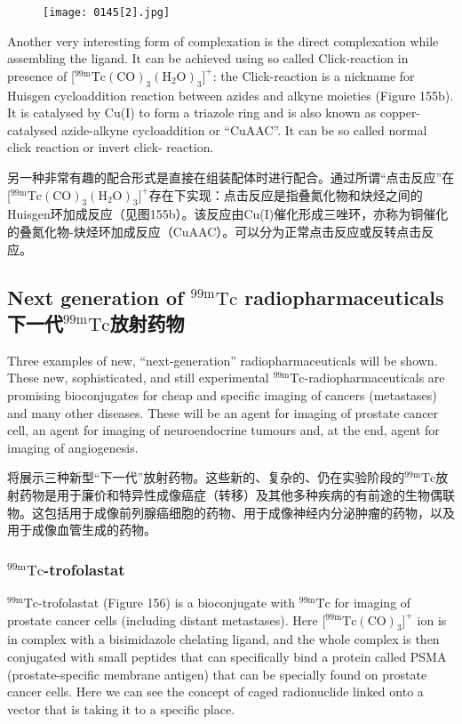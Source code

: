 \documentclass[dvipsnames, svgnames,a4paper,11pt]{article}
\begin{document}
\begin{figure}[h]
	\centering
    \texttt{[image: 0145[2].jpg]}    
     \label{fig155b}
\end{figure}

Another very interesting form of complexation is the direct complexation while
assembling the ligand. It can be achieved using so called Click-reaction in presence
of [${}^\mathrm{99m}\mathrm{Tc(CO)_3(H_2O)_3]^+}$: the Click-reaction is a nickname for Huisgen cycloaddition
reaction between azides and alkyne moieties (Figure 155b). It is catalysed by Cu(I)
to form a triazole ring and is also known as copper-catalysed azide-alkyne
cycloaddition or “CuAAC”. It can be so called normal click reaction or invert click-
reaction.

另一种非常有趣的配合形式是直接在组装配体时进行配合。通过所谓“点击反应”在[${}^\mathrm{99m}\mathrm{Tc(CO)_3(H_2O)_3]^+}$存在下实现：点击反应是指叠氮化物和炔烃之间的Huisgen环加成反应（见图155b）。该反应由Cu(I)催化形成三唑环，亦称为铜催化的叠氮化物-炔烃环加成反应（CuAAC）。可以分为正常点击反应或反转点击反应。



\subsection{Next generation of ${}^\mathrm{99m}\mathrm{Tc}$ radiopharmaceuticals \\下一代${}^\mathrm{99m}\mathrm{Tc}$放射药物}
Three examples of new, “next-generation” radiopharmaceuticals will be shown.
These new, sophisticated, and still experimental ${}^\mathrm{99m}\mathrm{Tc}$-radiopharmaceuticals are
promising bioconjugates for cheap and specific imaging of cancers (metastases) and
many other diseases. These will be an agent for imaging of prostate cancer cell, an
agent for imaging of neuroendocrine tumours and, at the end, agent for imaging of
angiogenesis.

将展示三种新型“下一代”放射药物。这些新的、复杂的、仍在实验阶段的${}^\mathrm{99m}\mathrm{Tc}$放射药物是用于廉价和特异性成像癌症（转移）及其他多种疾病的有前途的生物偶联物。这包括用于成像前列腺癌细胞的药物、用于成像神经内分泌肿瘤的药物，以及用于成像血管生成的药物。

\subsubsection{${}^\mathrm{99m}\mathrm{Tc}$-trofolastat}
${}^\mathrm{99m}\mathrm{Tc}$-trofolastat (Figure 156) is a bioconjugate with ${}^\mathrm{99m}\mathrm{Tc}$ for imaging of prostate
cancer cells (including distant metastases). Here [${}^\mathrm{99m}\mathrm{Tc(CO)_3}]^+$ ion is in complex with
a bisimidazole chelating ligand, and the whole complex is then conjugated with small
peptides that can specifically bind a protein called PSMA (prostate-specific
membrane antigen) that can be specially found on prostate cancer cells. Here we
can see the concept of caged radionuclide linked onto a vector that is taking it to a
specific place.
\end{document}
